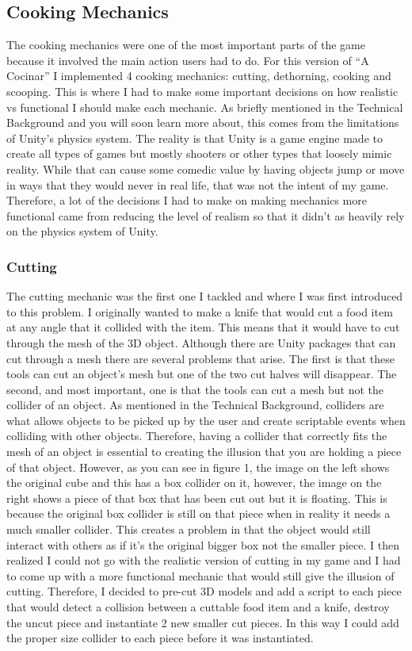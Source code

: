 \documentclass[10pt,twocolumn]{article}
\begin{document}
\subsection{Cooking Mechanics}
The cooking mechanics were one of the most important parts of the game because it involved the main action users had to do. For this version of “A Cocinar” I implemented 4 cooking mechanics: cutting, dethorning, cooking and scooping. This is where I had to make some important decisions on how realistic vs functional I should make each mechanic. As briefly mentioned in the Technical Background and you will soon learn more about, this comes from the limitations of Unity’s physics system. The reality is that Unity is a game engine made to create all types of games but mostly shooters or other types that loosely mimic reality. While that can cause some comedic value by having objects jump or move in ways that they would never in real life, that was not the intent of my game. Therefore, a lot of the decisions I had to make on making mechanics more functional came from reducing the level of realism so that it didn’t as heavily rely on the physics system of Unity.

\subsubsection{Cutting}
The cutting mechanic was the first one I tackled and where I was first introduced to this problem. I originally wanted to make a knife that would cut a food item at any angle that it collided with the item. This means that it would have to cut through the mesh of the 3D object. Although there are Unity packages that can cut through a mesh there are several problems that arise. The first is that these tools can cut an object's mesh but one of the two cut halves will disappear. The second, and most important, one is that the tools can cut a mesh but not the collider of an object. As mentioned in the Technical Background, colliders are what allows objects to be picked up by the user and create scriptable events when colliding with other objects. Therefore, having a collider that correctly fits the mesh of an object is essential to creating the illusion that you are holding a piece of that object. However, as you can see in figure 1, the image on the left shows the original cube and this has a box collider on it, however, the image on the right shows a piece of that box that has been cut out but it is floating. This is because the original box collider is still on that piece when in reality it needs a much smaller collider. This creates a problem in that the object would still interact with others as if it’s the original bigger box not the smaller piece. I then realized I could not go with the realistic version of cutting in my game and I had to come up with a more functional mechanic that would still give the illusion of cutting. Therefore, I decided to pre-cut 3D models and add a script to each piece that would detect a collision between a cuttable food item and a knife, destroy the uncut piece and instantiate 2 new smaller cut pieces. In this way I could add the proper size collider to each piece before it was instantiated.\par
\end{document}
